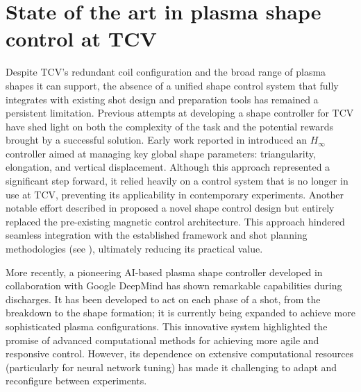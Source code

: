 \section{State of the art in plasma shape control at TCV}
\label{sec:sota_tcvshapectrl}
Despite TCV's redundant coil configuration and the broad range of plasma shapes it can support, the absence of a unified shape control system that fully integrates with existing shot design and preparation tools has remained a persistent limitation. Previous attempts at developing a shape controller for TCV have shed light on both the complexity of the task and the potential rewards brought by a successful solution. Early work reported in \cite{ariola_modern_1999,ariola_design_2002} introduced an $H_\infty$ controller aimed at managing key global shape parameters: triangularity, elongation, and vertical displacement. Although this approach represented a significant step forward, it relied heavily on a control system that is no longer in use at TCV, preventing its applicability in contemporary experiments. Another notable effort described in \cite{anand_novel_2017} proposed a novel shape control design but entirely replaced the pre-existing magnetic control architecture. This approach hindered seamless integration with the established framework and shot planning methodologies (see ), ultimately reducing its practical value.

More recently, a pioneering AI-based plasma shape controller developed in collaboration with Google DeepMind \cite{degrave_magnetic_2022} has shown remarkable capabilities during discharges. It has been developed to act on each phase of a shot, from the breakdown to the shape formation; it is currently being expanded to achieve more sophisticated plasma configurations. This innovative system highlighted the promise of advanced computational methods for achieving more agile and responsive control. However, its dependence on extensive computational resources (particularly for neural network tuning) has made it challenging to adapt and reconfigure between experiments.

